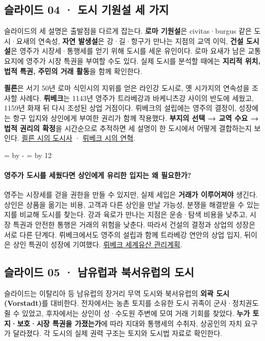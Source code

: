 \documentclass[10pt,a4paper]{article}
\newcommand{\ReserveQuestionSpace}{%
  \par\begingroup
  \dimen0=\pagegoal \advance\dimen0 by -\pagetotal
  \dimen2=\baselineskip \multiply\dimen2 by 12
  \ifdim\dimen0<\dimen2 \newpage\fi
  \endgroup}
\begin{document}
\subsection{슬라이드 04 · 도시 기원설 세 가지}
슬라이드의 세 설명은 출발점을 다르게 잡는다. \textbf{로마 기원설}은 civitas·burgus 같은 도시·요새의 연속성, \textbf{자연 발생설}은 강·길·항구가 만나는 지점의 교역 이익, \textbf{건설 도시설}은 영주가 시장세·통행세를 얻기 위해 도시를 세운 유인이다. 로마 요새가 남은 교통 요지에 영주가 시장 특권을 부여할 수도 있다. 실제 도시를 분석할 때에는 \textbf{지리적 위치, 법적 특권, 주민의 거래 활동}을 함께 확인한다.\par

\textbf{쾰른}은 서기 50년 로마 식민시의 지위를 얻은 라인강 도시로, 옛 시가지의 연속성을 조사할 사례다. \textbf{뤼베크}는 1143년 영주가 트라베강과 바케니츠강 사이의 반도에 세웠고, 1159년 화재 뒤 다시 조성된 상업 거점이다. 뤼베크의 설립에는 영주의 결정이, 성장에는 항구 입지와 상인에게 부여한 권리가 함께 작용했다. \textbf{부지의 선택 → 교역 수요 → 법적 권리의 확정}을 시간순으로 추적하면 세 설명이 한 도시에서 어떻게 결합하는지 보인다. \href{https://www.stadt-koeln.de/artikel/06768/index.html}{쾰른 시의 도시사} · \href{https://ausgrabunggruendungsviertel.luebeck.de/de/stadtleben/tourismus/luebeck/geschichte/zeittafel.html}{뤼베크 시의 연혁}.\par

\ReserveQuestionSpace
\paragraph{영주가 도시를 세웠다면 상인에게 유리한 입지는 왜 필요한가?}
영주는 시장세를 걷을 권한을 만들 수 있지만, 실제 세입은 \textbf{거래가 이루어져야} 생긴다. 상인은 상품을 옮기는 비용, 고객과 다른 상인을 만날 가능성, 분쟁을 해결받을 수 있는지를 비교해 도시를 찾는다. 강과 육로가 만나는 지점은 운송·탐색 비용을 낮추고, 시장 특권과 안전한 통행은 거래의 위험을 낮춘다. 따라서 건설의 결정과 상업의 성장은 서로 다른 단계다. 뤼베크에서도 영주의 설립과 함께 트라베강 연안의 상업 입지, 뒤이은 상인 특권이 성장에 기여했다. \href{https://bekanntmachungen.luebeck.de/dokumente/d/955/inline}{뤼베크 세계유산 관리계획}.\par

\subsection{슬라이드 05 · 남유럽과 북서유럽의 도시}
슬라이드는 이탈리아 등 남유럽의 장거리 무역 도시와 북서유럽의 \textbf{외곽 도시(Vorstadt)}를 대비한다. 전자에서는 농촌 토지를 소유한 도시 귀족이 군사·정치권도 쥘 수 있었고, 후자에서는 상인이 성·수도원 주변에 모여 거래 기회를 찾았다. \textbf{누가 토지·보호·시장 특권을 가졌는가}에 따라 지대와 통행세의 수취자, 상공인의 자치 요구가 달라졌다. 각 도시의 실제 권력 구조는 토지와 도시법 자료로 확인한다.\par
\end{document}

